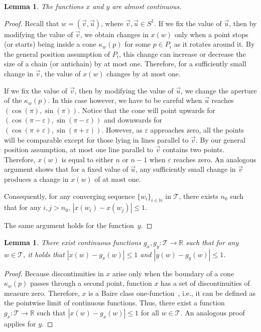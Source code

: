 \documentclass[a4paper, 11pt]{article}
\newtheorem{lemma}[theorem]{Lemma}
\newcommand{\ve}{{\ensuremath{\vec{v}}}}
\newcommand{\ue}{{\ensuremath{\vec{u}}}}
\newcommand{\we}{{\ensuremath{w}}}
\newcommand{\cone}[1]{\ensuremath{\kappa_{\we}(#1)}}
\newcommand{\torus}{\ensuremath{\mathcal T}}
\begin{document}
\begin{lemma}\label{lemma:Almost continuous}
The functions $x$ and $y$ are almost continuous.
\end{lemma}
\begin{proof}
Recall that $\we = (\ve, \ue)$, where $\ve,\ue\in S^1$.
If we fix the value of $\ue$, then by modifying the value of $\ve$, we obtain changes in $x(\we)$ only when a point stops (or starts) being inside a cone $\cone{p}$ for some $p\in P_i$ as it rotates around it. 
By the general position assumption of $P_i$, this change can increase or decrease the size of a chain (or antichain) by at most one.
Therefore, for a sufficiently small change in $\ve$, the value of $x(\we)$ changes by at most one.

If we fix the value of $\ve$, then by modifying the value of $\ue$, we change the aperture of the $\cone{p}$. 
In this case however, we have to be careful when $\ue$ reaches $(\cos(\pi), \sin(\pi))$.
Notice that the cone will point upwards for $(\cos(\pi-\varepsilon), \sin(\pi-\varepsilon))$ and downwards for $(\cos(\pi + \varepsilon), \sin(\pi+ \varepsilon))$. However, as $\varepsilon$ approaches zero, all the points will be comparable except for those lying in lines parallel to $\ve$. By our general position assumption, at most one line parallel to $\ve$ contains two points.
Therefore, $x(\we)$ is equal to either $n$ or $n-1$ when $\varepsilon$ reaches zero.
An analogous argument shows that for a fixed value of $\ue$, 
any sufficiently small change in $\ve$ produces a change in $x(\we)$ of at most one. 

Consequently, for any converging sequence $\{\we_i\}_{i\in \mathbb{N}}$ in $\torus$, 
there exists $n_0$ such that for any $i,j>n_0$, $|x(\we_i) - x(\we_j)| \leq 1$. 


The same argument holds for the function~$y$.
\end{proof}


\begin{lemma}\label{lemma:Similar function}
There exist continuous functions $g_x, g_y:\torus\to \mathbb{R}$ such that for any $\we\in \torus$, it holds that  $| x(\we) - g_x(\we) | \leq 1$ and $| y(\we) - g_y(\we) |\leq 1$.
\end{lemma}
\begin{proof}
Because discontinuities in $x$ arise only when the boundary of a cone $\cone{p}$ passes through a second point, function $x$ has a set of discontinuities of measure zero. Therefore, $x$ is a Baire class one-function~\cite{?}, i.e., it can be defined as the pointwise limit of continuous functions. Thus, there exist a function $g_x:\torus \to \mathbb{R}$ such that $| x(\we) - g_x(\we) | \leq 1$ for all $\we\in \torus$. An analogous proof applies for $y$.
\end{proof}
\end{document}
